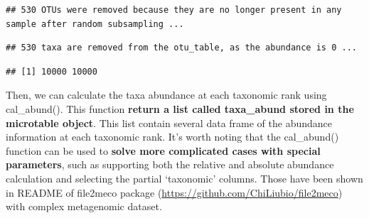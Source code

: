 \documentclass[
]{book}
\newenvironment{Shaded}{\begin{snugshade}}{\end{snugshade}}
\newcommand{\AttributeTok}[1]{\textcolor[rgb]{0.77,0.63,0.00}{#1}}
\newcommand{\CommentTok}[1]{\textcolor[rgb]{0.56,0.35,0.01}{\textit{#1}}}
\newcommand{\DecValTok}[1]{\textcolor[rgb]{0.00,0.00,0.81}{#1}}
\newcommand{\FunctionTok}[1]{\textcolor[rgb]{0.00,0.00,0.00}{#1}}
\newcommand{\NormalTok}[1]{#1}
\newcommand{\SpecialCharTok}[1]{\textcolor[rgb]{0.00,0.00,0.00}{#1}}
\begin{document}
\begin{Shaded}
\end{Shaded}

\begin{verbatim}
## 530 OTUs were removed because they are no longer present in any sample after random subsampling ...
\end{verbatim}

\begin{verbatim}
## 530 taxa are removed from the otu_table, as the abundance is 0 ...
\end{verbatim}

\begin{Shaded}
\end{Shaded}

\begin{verbatim}
## [1] 10000 10000
\end{verbatim}

Then, we can calculate the taxa abundance at each taxonomic rank using cal\_abund().
This function \textbf{return a list called taxa\_abund stored in the microtable object}.
This list contain several data frame of the abundance information at each taxonomic rank.
It's worth noting that the cal\_abund() function can be used to \textbf{solve more complicated cases with special parameters},
such as supporting both the relative and absolute abundance calculation and selecting the partial `taxonomic' columns.
Those have been shown in README of file2meco package (\url{https://github.com/ChiLiubio/file2meco}) with complex metagenomic dataset.

\begin{Shaded}
\end{Shaded}
\end{document}
